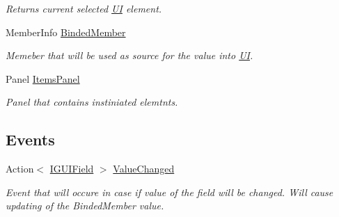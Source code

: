 \begin{DoxyCompactItemize}
\begin{DoxyCompactList}\small\item\em Returns current selected \mbox{\hyperlink{namespace_wpf_handler_1_1_u_i}{UI}} element. \end{DoxyCompactList}\item 
Member\+Info \mbox{\hyperlink{class_wpf_handler_1_1_u_i_1_1_controls_1_1_flat_toggles_group_a23b02958e22396a5fb45255cad69eac0}{Binded\+Member}}
\begin{DoxyCompactList}\small\item\em Memeber that will be used as source for the value into \mbox{\hyperlink{namespace_wpf_handler_1_1_u_i}{UI}}. \end{DoxyCompactList}\item 
Panel \mbox{\hyperlink{class_wpf_handler_1_1_u_i_1_1_controls_1_1_flat_toggles_group_a89515b615bad1290bf2342ff791b8f16}{Items\+Panel}}
\begin{DoxyCompactList}\small\item\em Panel that contains instiniated elemtnts. \end{DoxyCompactList}\end{DoxyCompactItemize}
\subsection*{Events}
\begin{DoxyCompactItemize}
\item 
Action$<$ \mbox{\hyperlink{interface_wpf_handler_1_1_u_i_1_1_auto_layout_1_1_i_g_u_i_field}{I\+G\+U\+I\+Field}} $>$ \mbox{\hyperlink{class_wpf_handler_1_1_u_i_1_1_controls_1_1_flat_toggles_group_aa00366c7443bee714b067ee15186de82}{Value\+Changed}}
\begin{DoxyCompactList}\small\item\em Event that will occure in case if value of the field will be changed. Will cause updating of the Binded\+Member value. \end{DoxyCompactList}\end{DoxyCompactItemize}
